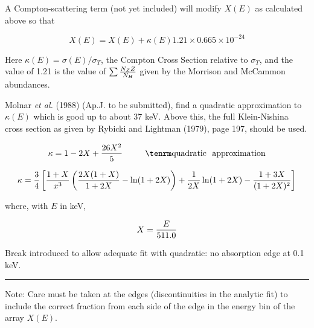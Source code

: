 \vskip 18pt

{\listlist

A Compton-scattering term (not yet included) will modify $X(E)$ as
calculated
above so that

}

$$X(E) = X(E) + \kappa(E) 1.21 \times 0.665 \times 10^{-24}$$

\itemitem{}Here $\kappa(E) = \sigma(E)/\sigma_T$, the Compton Cross Section
relative to $\sigma_T$, and the value of 1.21 is the value of
$\sum {{N_Z Z} \over N_H}$ given by the Morrison and McCammon abundances.

\itemitem{}Molnar {\it et al.} (1988) (Ap.J. to be submitted), find a quadratic
approximation to $\kappa(E)$ which is good up to about 37 keV.  Above
this,
the full Klein-Nishina cross section as  given by Rybicki and Lightman
(1979),
page 197, should be used.

$$\kappa = 1- 2X + {26 X^2 \over 5} ~~~~~~~~{\rm quadratic~~approximation}$$

$$\kappa = {3 \over 4} \left[ {{1+X} \over x^3} \left( {{2 X (1+X)} \over
{1+ 2X} } - \ln (1 + 2X) \right) + {1 \over {2X}} \ln (1+2X)
- {{1+3X} \over (1+2X)^2} \right]$$

\itemitem{}where, with $E$ in keV,

$$X = {E \over 511.0}$$

\centerline{}
\vskip 18pt 
\centerline{}

{\parindent
\vbox{}}


Break introduced to allow adequate fit with quadratic:  no absorption
edge at 0.1 keV.

\hrule


Note:  Care must be taken at the edges (discontinuities in the analytic fit)
to include the correct fraction from each side of the edge in the energy bin of the
array $X(E).$

